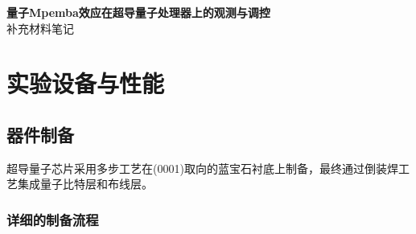\documentclass[11pt,a4paper]{article}
\begin{document}
\begin{center}
    {\LARGE \textbf{量子Mpemba效应在超导量子处理器上的观测与调控}} \\[6pt]
    {\large 补充材料笔记}
\end{center}

\section{实验设备与性能}

\subsection{器件制备}

超导量子芯片采用多步工艺在(0001)取向的蓝宝石衬底上制备，最终通过倒装焊工艺集成量子比特层和布线层。

\subsubsection{详细的制备流程}
\end{document}
